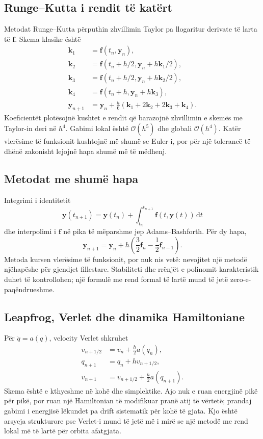 \documentclass[11pt,oneside,openany]{book}
\newcommand{\vect}[1]{\bm{#1}}
\newcommand{\dd}{\,\mathrm{d}}
\newcommand{\Oh}{\mathcal{O}}
\begin{document}
\subsection{Runge--Kutta i rendit të katërt}
Metodat Runge--Kutta përputhin zhvillimin Taylor pa llogaritur derivate të larta të $\vect f$. Skema klasike është
\begin{align}
 \vect k_1&=\vect f(t_n,\vect y_n),\\
 \vect k_2&=\vect f(t_n+h/2,\vect y_n+h\vect k_1/2),\\
 \vect k_3&=\vect f(t_n+h/2,\vect y_n+h\vect k_2/2),\\
 \vect k_4&=\vect f(t_n+h,\vect y_n+h\vect k_3),\\
 \vect y_{n+1}&=\vect y_n+\frac{h}{6}(\vect k_1+2\vect k_2+2\vect k_3+\vect k_4).
\end{align}
Koeficientët plotësojnë kushtet e rendit që barazojnë zhvillimin e skemës me Taylor-in deri në $h^4$. Gabimi lokal është $\Oh(h^5)$ dhe globali $\Oh(h^4)$. Katër vlerësime të funksionit kushtojnë më shumë se Euler-i, por për një tolerancë të dhënë zakonisht lejojnë hapa shumë më të mëdhenj.

\subsection{Metodat me shumë hapa}
Integrimi i identitetit
\begin{equation}
 \vect y(t_{n+1})=\vect y(t_n)+\int_{t_n}^{t_{n+1}}\vect f(t,\vect y(t))\dd t
\end{equation}
dhe interpolimi i $\vect f$ në pika të mëparshme jep Adams--Bashforth. Për dy hapa,
\begin{equation}
 \vect y_{n+1}=\vect y_n+h\left(\frac32\vect f_n-\frac12\vect f_{n-1}\right).
\end{equation}
Metoda kursen vlerësime të funksionit, por nuk nis vetë: nevojitet një metodë njëhapëshe për gjendjet fillestare. Stabiliteti dhe rrënjët e polinomit karakteristik duhet të kontrollohen; një formulë me rend formal të lartë mund të jetë zero-e-paqëndrueshme.

\subsection{Leapfrog, Verlet dhe dinamika Hamiltoniane}
Për $\ddot q=a(q)$, velocity Verlet shkruhet
\begin{align}
 v_{n+1/2}&=v_n+\frac h2a(q_n),\\
 q_{n+1}&=q_n+hv_{n+1/2},\\
 v_{n+1}&=v_{n+1/2}+\frac h2a(q_{n+1}).
\end{align}
Skema është e kthyeshme në kohë dhe simplektike. Ajo nuk e ruan energjinë pikë për pikë, por ruan një Hamiltonian të modifikuar pranë atij të vërtetë; prandaj gabimi i energjisë lëkundet pa drift sistematik për kohë të gjata. Kjo është arsyeja strukturore pse Verlet-i mund të jetë më i mirë se një metodë me rend lokal më të lartë për orbita afatgjata.
\end{document}
